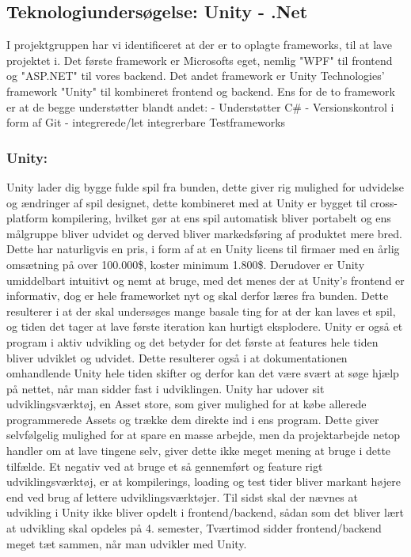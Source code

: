 \subsection{Teknologiundersøgelse: Unity - .Net}

I projektgruppen har vi identificeret at der er to oplagte frameworks, til at lave projektet i.
Det første framework er Microsofts eget, nemlig "WPF" til frontend og "ASP.NET" til vores backend.
Det andet framework er Unity Technologies' framework "Unity" til kombineret frontend og backend.
Ens for de to framework er at de begge understøtter blandt andet:
- Understøtter C\# 
- Versionskontrol i form af Git
- integrerede/let integrerbare Testframeworks

\subsubsection{Unity:}

Unity lader dig bygge fulde spil fra bunden, dette giver rig mulighed for udvidelse og ændringer af spil designet, dette kombineret med 
at Unity er bygget til cross-platform kompilering, hvilket gør at ens spil automatisk bliver portabelt og ens målgruppe bliver udvidet og derved
bliver markedsføring af produktet mere bred. Dette har naturligvis en pris, i form af at en Unity licens til firmaer med en årlig omsætning 
på over 100.000\$, koster minimum 1.800\$.
Derudover er Unity umiddelbart intuitivt og nemt at bruge, med det menes der at Unity's frontend er informativ, 
dog er hele frameworket nyt og skal derfor læres fra bunden. Dette resulterer i at der skal undersøges mange basale ting for at der kan laves et spil,
og tiden det tager at lave første iteration kan hurtigt eksplodere. Unity er også et program i aktiv udvikling og det betyder
for det første at features hele tiden bliver udviklet og udvidet. Dette resulterer også i at dokumentationen omhandlende Unity
hele tiden skifter og derfor kan det være svært at søge hjælp på nettet, når man sidder fast i udviklingen.
Unity har udover sit udviklingsværktøj, en Asset store, som giver mulighed for at købe allerede programmerede Assets og trække dem direkte ind
i ens program. Dette giver selvfølgelig mulighed for at spare en masse arbejde, men da projektarbejde netop handler om at lave tingene selv,
giver dette ikke meget mening at bruge i dette tilfælde.
Et negativ ved at bruge et så gennemført og feature rigt udviklingsværktøj, er at kompilerings, loading og test tider bliver markant højere end
ved brug af lettere udviklingsværktøjer.
Til sidst skal der nævnes at udvikling i Unity ikke bliver opdelt i frontend/backend, sådan som det bliver lært at udvikling skal opdeles på 4. semester,
Tværtimod sidder frontend/backend meget tæt sammen, når man udvikler med Unity.\cite{Unity.com} \cite{Choose-Unity} \cite{Unity-Pros-Cons}



